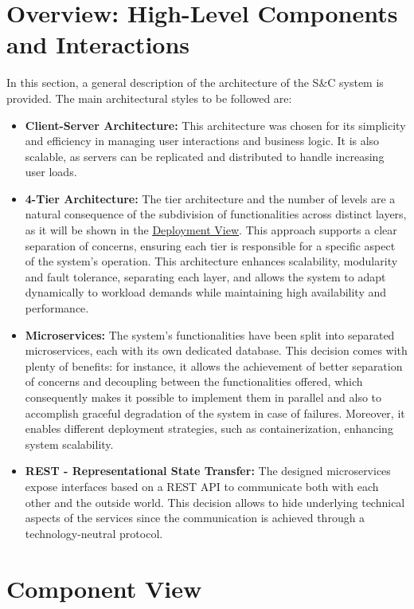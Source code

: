 \section{Overview: High-Level Components and Interactions}
\label{sec: overview}
In this section, a general description of the architecture of the S\&C system is provided.
The main architectural styles to be followed are:
\begin{itemize}
    \item \textbf{Client-Server Architecture:} This architecture was chosen for its simplicity and efficiency in managing user interactions and business logic. It is also scalable, as servers can be replicated and distributed to handle increasing user loads.
    \item \textbf{4-Tier Architecture:} The tier architecture and the number of levels are a natural consequence of the subdivision of functionalities across distinct layers, as it will be shown in the \hyperref[sec: deployment_view]{\uline{Deployment View}}. This approach supports a clear separation of concerns, ensuring each tier is responsible for a specific aspect of the system’s operation. This architecture enhances scalability, modularity and fault tolerance, separating each layer, and allows the system to adapt dynamically to workload demands while maintaining high availability and performance.
    \item \textbf{Microservices:} The system's functionalities have been split into separated microservices, each with its own dedicated database. This decision comes with plenty of benefits: for instance, it allows the achievement of better separation of concerns and decoupling between the functionalities offered, which consequently makes it possible to implement them in parallel and also to accomplish graceful degradation of the system in case of failures. Moreover, it enables different deployment strategies, such as containerization, enhancing system scalability.
    \item \textbf{REST - Representational State Transfer:} The designed microservices expose interfaces based on a REST API to communicate both with each other and the outside world. This decision allows to hide underlying technical aspects of the services since the communication is achieved through a technology-neutral protocol.
\end{itemize}

\newpage

\section{Component View}
\label{sec: component_view}

